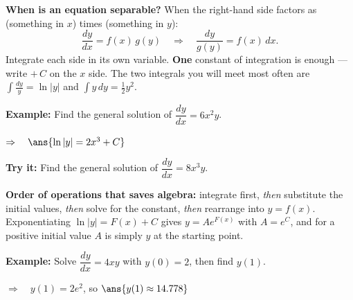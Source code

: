 \documentclass[12pt]{article}
\begin{document}


\begin{formulabox}
\textbf{When is an equation separable?} When the right-hand side factors as (something in $x$) times (something in $y$):
\[ \frac{dy}{dx} = f(x)\,g(y) \quad\Longrightarrow\quad \frac{dy}{g(y)} = f(x)\,dx. \]
Integrate each side in its own variable. \textbf{One} constant of integration is enough --- write $+\,C$ on the $x$ side. The two integrals you will meet most often are $\displaystyle\int \frac{dy}{y} = \ln|y|$ and $\displaystyle\int y\,dy = \tfrac{1}{2}y^2$.
\end{formulabox}

\begin{examplebox}
\textbf{Example:} \quad Find the general solution of $\dfrac{dy}{dx} = 6x^2 y$.

$\Rightarrow\quad \ans{\ln|y| = 2x^3 + C}$
\end{examplebox}

\begin{tryitbox}
\textbf{Try it:} \quad Find the general solution of $\dfrac{dy}{dx} = 8x^3 y$.\\[2pt]
\end{tryitbox}


\begin{formulabox}
\textbf{Order of operations that saves algebra:} integrate first, \emph{then} substitute the initial values, \emph{then} solve for the constant, \emph{then} rearrange into $y = f(x)$. Exponentiating $\ln|y| = F(x) + C$ gives $y = Ae^{F(x)}$ with $A = e^{C}$, and for a positive initial value $A$ is simply $y$ at the starting point.
\end{formulabox}

\begin{examplebox}
\textbf{Example:} \quad Solve $\dfrac{dy}{dx} = 4xy$ with $y(0) = 2$, then find $y(1)$.

$\Rightarrow\quad y(1) = 2e^{2}$, so $\ans{y(1) \approx 14.778}$
\end{examplebox}
\end{document}
